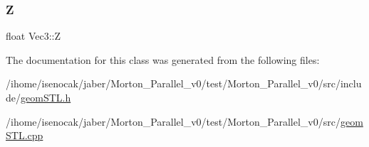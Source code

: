 \subsubsection{\texorpdfstring{Z}{Z}}
{\footnotesize\ttfamily float Vec3\+::Z}



The documentation for this class was generated from the following files\+:\begin{DoxyCompactItemize}
\item 
/ihome/isenocak/jaber/\+Morton\+\_\+\+Parallel\+\_\+v0/test/\+Morton\+\_\+\+Parallel\+\_\+v0/src/include/\mbox{\hyperlink{geomSTL_8h}{geom\+S\+T\+L.\+h}}\item 
/ihome/isenocak/jaber/\+Morton\+\_\+\+Parallel\+\_\+v0/test/\+Morton\+\_\+\+Parallel\+\_\+v0/src/\mbox{\hyperlink{geomSTL_8cpp}{geom\+S\+T\+L.\+cpp}}\end{DoxyCompactItemize}
